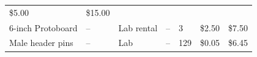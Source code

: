 \documentclass[]{article}
\begin{document}
\begin{longtable}[]{@{}lllllll@{}}
\begin{minipage}[t]{0.06\columnwidth}
\$5.00\strut
\end{minipage} & \begin{minipage}[t]{0.07\columnwidth}\raggedright
\$15.00\strut
\end{minipage}\tabularnewline
\begin{minipage}[t]{0.15\columnwidth}\raggedright
6-inch Protoboard\strut
\end{minipage} & \begin{minipage}[t]{0.15\columnwidth}\raggedright
--\strut
\end{minipage} & \begin{minipage}[t]{0.10\columnwidth}\raggedright
Lab rental\strut
\end{minipage} & \begin{minipage}[t]{0.17\columnwidth}\raggedright
--\strut
\end{minipage} & \begin{minipage}[t]{0.11\columnwidth}\raggedright
3\strut
\end{minipage} & \begin{minipage}[t]{0.06\columnwidth}\raggedright
\$2.50\strut
\end{minipage} & \begin{minipage}[t]{0.07\columnwidth}\raggedright
\$7.50\strut
\end{minipage}\tabularnewline
\begin{minipage}[t]{0.15\columnwidth}\raggedright
Male header pins\strut
\end{minipage} & \begin{minipage}[t]{0.15\columnwidth}\raggedright
--\strut
\end{minipage} & \begin{minipage}[t]{0.10\columnwidth}\raggedright
Lab\strut
\end{minipage} & \begin{minipage}[t]{0.17\columnwidth}\raggedright
--\strut
\end{minipage} & \begin{minipage}[t]{0.11\columnwidth}\raggedright
129\strut
\end{minipage} & \begin{minipage}[t]{0.06\columnwidth}\raggedright
\$0.05\strut
\end{minipage} & \begin{minipage}[t]{0.07\columnwidth}\raggedright
\$6.45\strut
\end{minipage}\tabularnewline
\bottomrule
\end{longtable}
\end{document}
